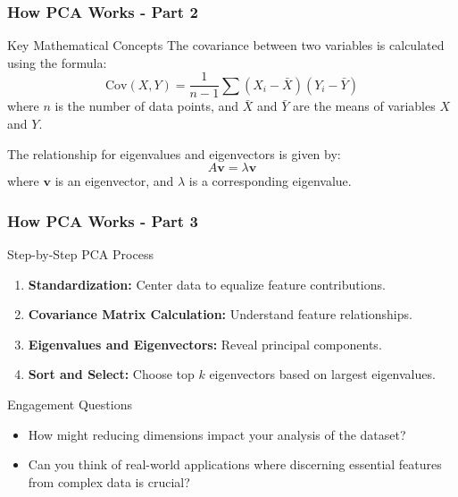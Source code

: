 \documentclass[aspectratio=169]{beamer}
\begin{document}
\begin{frame}[fragile]
    \frametitle{How PCA Works - Part 2}
    
    \begin{block}{Key Mathematical Concepts}
        The covariance between two variables is calculated using the formula:
        \begin{equation}
        \text{Cov}(X, Y) = \frac{1}{n-1} \sum (X_i - \bar{X})(Y_i - \bar{Y})
        \end{equation}
        where $n$ is the number of data points, and $\bar{X}$ and $\bar{Y}$ are the means of variables $X$ and $Y$.
        
        The relationship for eigenvalues and eigenvectors is given by:
        \begin{equation}
        A\mathbf{v} = \lambda\mathbf{v}
        \end{equation}
        where $\mathbf{v}$ is an eigenvector, and $\lambda$ is a corresponding eigenvalue.
    \end{block}
\end{frame}

\begin{frame}[fragile]
    \frametitle{How PCA Works - Part 3}
    
    \begin{block}{Step-by-Step PCA Process}
        \begin{enumerate}
            \item \textbf{Standardization:} Center data to equalize feature contributions.
            \item \textbf{Covariance Matrix Calculation:} Understand feature relationships.
            \item \textbf{Eigenvalues and Eigenvectors:} Reveal principal components.
            \item \textbf{Sort and Select:} Choose top $k$ eigenvectors based on largest eigenvalues.
        \end{enumerate}
    \end{block}
    
    \begin{block}{Engagement Questions}
        \begin{itemize}
            \item How might reducing dimensions impact your analysis of the dataset?
            \item Can you think of real-world applications where discerning essential features from complex data is crucial?
        \end{itemize}
    \end{block}
\end{frame}
\end{document}
